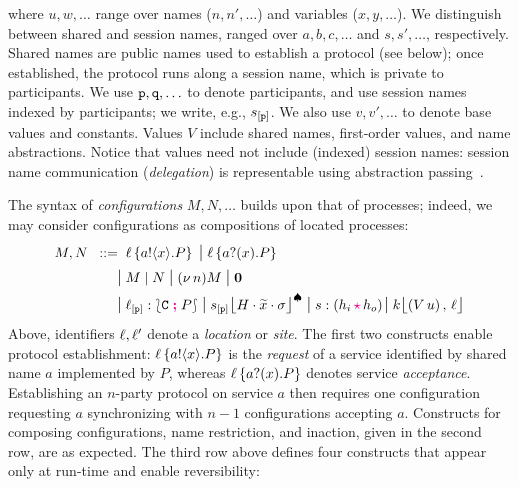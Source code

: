 \documentclass[runningheads,plain]{llncs}
\begin{document}
\noindent 
where  
$u, w, \ldots$
range over 
names ($n, n', \ldots$) and variables ($x,y,\ldots$).
We distinguish between shared and session names, 
ranged over
$a,b,c,\ldots$ and $s,s',\ldots$, respectively.
Shared names are public names used to establish a protocol (see below); once established, the protocol runs along a session name, which is private to participants.
We   use $\mathtt{p}, \mathtt{q}, \ldots$ to denote  participants, and 
use session names indexed by participants;  we write, e.g., $s_{[\mathtt{p}]}$.
We also use $v,v',\ldots$ to denote
     base values and constants. 
Values $V$ include shared names, 
first-order values, and  {name abstractions}.
Notice that values need not include (indexed) session names: 
session name communication (\emph{delegation}) is  representable using abstraction passing~\cite{KPY2016}.

The syntax of \emph{configurations} $M, N, \ldots$ builds upon that of processes; indeed, we may consider configurations as compositions of located processes:
\begin{align*}
M,N		 \bnfis &
\myloc{\loc}{\bout{a}{x}{P}}
\sbnfbar 
\myloc{\loc}{\binp{a}{x}{P}}
\\
\sbnfbar &
M \Par N 
\sbnfbar 
\news{n} M
\sbnfbar 
\inact 
\\
 \sbnfbar &
{\np{\ep{\loc}{\p}}{\conf{\stack C}{P}}} %
\sbnfbar 
{\monig{\ep{s}{\p}}{H}{\mytilde{x}}{\store}}  %
 \sbnfbar 
\codah{s}{h_i}{h_o}%
\sbnfbar 
 {\mem{k}{(\appl{V}{u})}{\loc}} %
\end{align*}
Above,  identifiers $\ell, \ell'$ denote a  \emph{location} or  \emph{site}. 
The first two constructs enable protocol establishment:
$\ell\left\{a ! \langle x \rangle .{P}\right\}$ is the \emph{request} of a service identified by shared name $a$ implemented by
$P$, whereas $\ell\left\{a ? (x) .{P}\right\}$ denotes service \emph{acceptance}. 
Establishing an $n$-party protocol on service $a$ then requires one configuration requesting $a$ 
synchronizing with  $n-1$ configurations accepting $a$.
Constructs for  composing configurations, name restriction, and  inaction, given in the second row, are as expected.
The third row above defines four constructs that appear only at run-time 
and   enable  reversibility:
\end{document}
